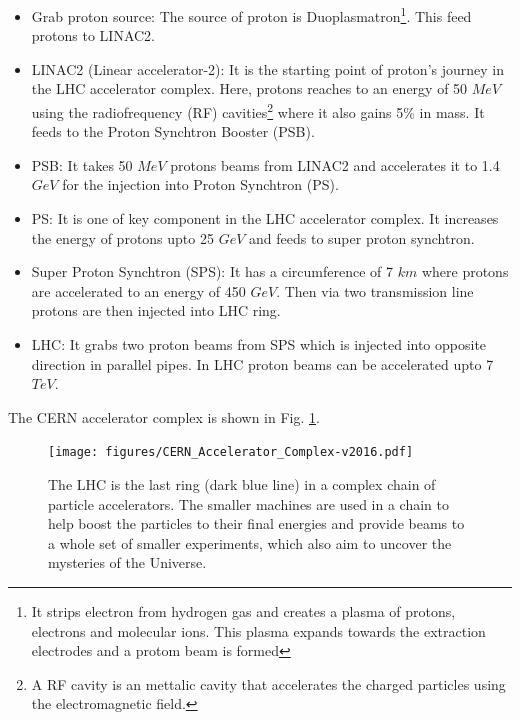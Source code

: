 \begin{itemize}
    \item Grab proton source: The source of proton is Duoplasmatron\footnote{It strips electron from hydrogen gas and creates a plasma of protons, electrons and molecular ions. This plasma expands towards the extraction electrodes and a protom beam is formed}\cite{LHC-tdr-vol3}. This feed protons to LINAC2.
    \item LINAC2 (Linear accelerator-2): It is the starting point of proton's journey in the LHC accelerator complex. Here, protons reaches to an energy of 50 $MeV$ using the radiofrequency (RF) cavities\footnote{A RF cavity is an mettalic cavity that accelerates the charged particles using the electromagnetic field.} where it also gains 5\% in mass. It feeds to the Proton Synchtron Booster (PSB).
    \item PSB: It takes 50 $MeV$ protons beams from LINAC2 and accelerates it to 1.4 $GeV$ for the injection into Proton Synchtron (PS).
    \item PS: It is one of key component in the LHC accelerator complex. It increases the energy of protons upto 25 $GeV$ and feeds to super proton synchtron.
    \item Super Proton Synchtron (SPS): It has a circumference of 7 $km$ where protons are accelerated to an energy of 450 $GeV$. Then via two transmission line protons are then injected into LHC ring.
    \item LHC: It grabs two proton beams from SPS which is injected into opposite direction in parallel pipes. In LHC proton beams can be accelerated upto 7 $TeV$.
\end{itemize}
The CERN accelerator complex is shown in Fig. \ref{fig:CERN-accelerator-complex}.  
\begin{figure}[!ht]
  \texttt{[image: figures/CERN\_Accelerator\_Complex-v2016.pdf]}
  \caption{The LHC is the last ring (dark blue line) in a complex chain of particle accelerators. The smaller machines are used in a chain to help boost the particles to their final energies and provide beams to a whole set of smaller experiments, which also aim to uncover the mysteries of the Universe. \cite{Fig-CERN-accelerator-complex}}
  \label{fig:CERN-accelerator-complex}
\end{figure}


